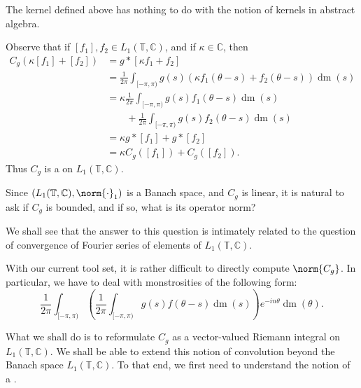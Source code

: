\documentclass[notoc,notitlepage]{tufte-book}
\DeclareMathOperator{\dm}{dm}
\begin{document}
\begin{warning}
  The kernel defined above has nothing to do with the notion of
  kernels in abstract algebra.
\end{warning}

\begin{remark}
  Observe that if $[f_1], f_2 \in L_1(\mathbb{T}, \mathbb{C})$,
  and if $\kappa \in \mathbb{C}$, then
  \begin{align*}
    C_g(\kappa[f_1] + [f_2])
    &= g * [\kappa f_1 + f_2] \\
    &= \frac{1}{2\pi} \int_{[-\pi, \pi)}
      g(s)(\kappa f_1(\theta - s) + f_2(\theta - s)) \dm(s) \\
    &= \kappa \frac{1}{2\pi} \int_{[-\pi, \pi)} g(s) f_1(\theta - s) \dm(s) \\
    &\qquad + \frac{1}{2\pi} \int_{[-\pi, \pi)} g(s) f_2(\theta - s) \dm(s) \\
    &= \kappa g * [f_1] + g * [f_2] \\
    &= \kappa C_g([f_1]) + C_g([f_2]).
  \end{align*}
  Thus $C_g$ is a  on $L_1(\mathbb{T}, \mathbb{C})$.

  Since $(L_1(\mathbb{T}, \mathbb{C}), \norm{\cdot}_1)$ is a Banach space,
  and $C_g$ is linear, it is natural to ask if $C_g$ is bounded,
  and if so, what is its operator norm?

  We shall see that the answer to this question
  is intimately related to the question of convergence
  of Fourier series of elements of $L_1(\mathbb{T}, \mathbb{C})$.
\end{remark}

With our current tool set, it is rather difficult to directly compute
$\norm{C_g}$. In particular, we have to deal with monstrosities
of the following form:
\begin{equation*}
  \frac{1}{2\pi} \int_{[-\pi, \pi)} \left( 
    \frac{1}{2\pi} \int_{[-\pi, \pi)} g(s) f(\theta - s) \dm(s)
  \right) e^{-in\theta} \dm(\theta).
\end{equation*}

What we shall do is to reformulate $C_g$ as a vector-valued Riemann integral
on $L_1(\mathbb{T}, \mathbb{C})$. We shall be able to extend this notion
of convolution beyond the Banach space $L_1(\mathbb{T}, \mathbb{C})$.
To that end, we first need to understand the notion of a
.

\end{document}
